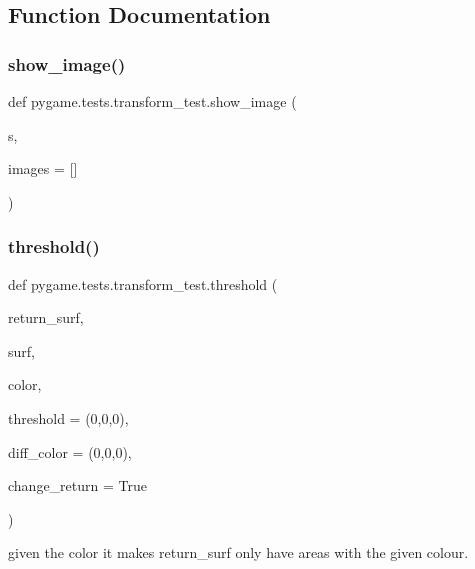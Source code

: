 \subsection{Function Documentation}
\mbox{\label{namespacepygame_1_1tests_1_1transform__test_afaa0a3a8b4fe6a56533daf366230f591}} 
\subsubsection{\texorpdfstring{show\+\_\+image()}{show\_image()}}
{\footnotesize\ttfamily def pygame.\+tests.\+transform\+\_\+test.\+show\+\_\+image (\begin{DoxyParamCaption}\item[{}]{s,  }\item[{}]{images = {\ttfamily \mbox{[}\mbox{]}} }\end{DoxyParamCaption})}

\mbox{\label{namespacepygame_1_1tests_1_1transform__test_ab035edff24ce1faee9938bec517421ca}} 
\subsubsection{\texorpdfstring{threshold()}{threshold()}}
{\footnotesize\ttfamily def pygame.\+tests.\+transform\+\_\+test.\+threshold (\begin{DoxyParamCaption}\item[{}]{return\+\_\+surf,  }\item[{}]{surf,  }\item[{}]{color,  }\item[{}]{threshold = {\ttfamily (0,0,0)},  }\item[{}]{diff\+\_\+color = {\ttfamily (0,0,0)},  }\item[{}]{change\+\_\+return = {\ttfamily True} }\end{DoxyParamCaption})}

\begin{DoxyVerb}given the color it makes return_surf only have areas with the given colour.
\end{DoxyVerb}
 

